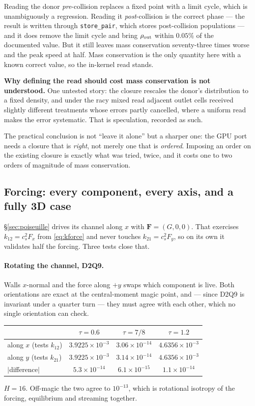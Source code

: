 \documentclass[11pt,a4paper]{article}
\newcommand{\cs}{c_s}
\newcommand{\e}[1]{\times 10^{#1}}
\begin{document}
\noindent Reading the donor \emph{pre}-collision replaces a fixed point with a
limit cycle, which is unambiguously a regression. Reading it
\emph{post}-collision is the correct phase --- the result is written through
\texttt{store\_pair}, which stores post-collision populations --- and it does
remove the limit cycle and bring $\rho_{\rm out}$ within $0.05\%$ of the
documented value. But it still leaves mass conservation seventy-three times
worse and the peak speed at half. Mass conservation is the only quantity here
with a known correct value, so the in-kernel read stands.

\textbf{Why defining the read should cost mass conservation is not understood.}
One untested story: the closure rescales the donor's distribution to a fixed
density, and under the racy mixed read adjacent outlet cells received slightly
different treatments whose errors partly cancelled, where a uniform read makes
the error systematic. That is speculation, recorded as such.

The practical conclusion is not ``leave it alone'' but a sharper one: the GPU
port needs a closure that is \emph{right}, not merely one that is
\emph{ordered}. Imposing an order on the existing closure is exactly what was
tried, twice, and it costs one to two orders of magnitude of mass conservation.

\subsection{Forcing: every component, every axis, and a fully 3D case}
\label{sec:forceval}

\S\ref{sec:poiseuille} drives its channel along $x$ with $\bm F=(G,0,0)$. That
exercises $k_{12}=\cs^2F_x$ from \eqref{eq:kforce} and never touches
$k_{21}=\cs^2F_y$, so on its own it validates half the forcing. Three tests
close that.

\paragraph{Rotating the channel, D2Q9.} Walls $x$-normal and the force along
$+y$ swaps which component is live. Both orientations are exact at the
central-moment magic point, and --- since D2Q9 is invariant under a quarter
turn --- they must agree with each other, which no single orientation can check.

\begin{center}\small
\begin{tabular}{lccc}
\toprule
& $\tau=0.6$ & $\tau=7/8$ & $\tau=1.2$ \\
\midrule
along $x$ (tests $k_{12}$) & $3.9225\e{-3}$ & $3.06\e{-14}$ & $4.6356\e{-3}$ \\
along $y$ (tests $k_{21}$) & $3.9225\e{-3}$ & $3.14\e{-14}$ & $4.6356\e{-3}$ \\
\midrule
$|$difference$|$ & $5.3\e{-14}$ & $6.1\e{-15}$ & $1.1\e{-14}$ \\
\bottomrule
\end{tabular}
\end{center}
\noindent$H=16$. Off-magic the two agree to $10^{-13}$, which is rotational
isotropy of the forcing, equilibrium and streaming together.
\end{document}
